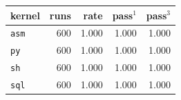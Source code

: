 \begin{tabular}{lrrrr}
\toprule
kernel & runs & rate & pass$^1$ & pass$^3$ \\
\midrule
\texttt{asm} & 600 & 1.000 & 1.000 & 1.000 \\
\texttt{py} & 600 & 1.000 & 1.000 & 1.000 \\
\texttt{sh} & 600 & 1.000 & 1.000 & 1.000 \\
\texttt{sql} & 600 & 1.000 & 1.000 & 1.000 \\
\bottomrule
\end{tabular}
